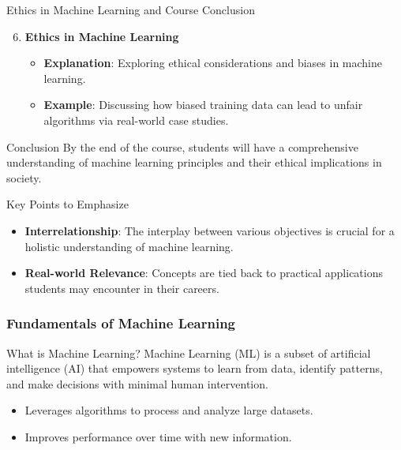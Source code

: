 \documentclass[aspectratio=169]{beamer}
\begin{document}
\begin{frame}[fragile]{Ethics in Machine Learning and Course Conclusion}
    \begin{enumerate}
        \setcounter{enumi}{5}
        \item \textbf{Ethics in Machine Learning}
            \begin{itemize}
                \item \textbf{Explanation}: Exploring ethical considerations and biases in machine learning.
                \item \textbf{Example}: Discussing how biased training data can lead to unfair algorithms via real-world case studies.
            \end{itemize}
    \end{enumerate}
    
    \begin{block}{Conclusion}
        By the end of the course, students will have a comprehensive understanding of machine learning principles and their ethical implications in society.
    \end{block}
\end{frame}

\begin{frame}[fragile]{Key Points to Emphasize}
    \begin{itemize}
        \item \textbf{Interrelationship}: The interplay between various objectives is crucial for a holistic understanding of machine learning.
        \item \textbf{Real-world Relevance}: Concepts are tied back to practical applications students may encounter in their careers.
    \end{itemize}
\end{frame}

\begin{frame}[fragile]
    \frametitle{Fundamentals of Machine Learning}
    
    \begin{block}{What is Machine Learning?}
        Machine Learning (ML) is a subset of artificial intelligence (AI) that empowers systems to learn from data, identify patterns, and make decisions with minimal human intervention.
    \end{block}
    
    \begin{itemize}
        \item Leverages algorithms to process and analyze large datasets.
        \item Improves performance over time with new information.
    \end{itemize}
    
\end{frame}
\end{document}
